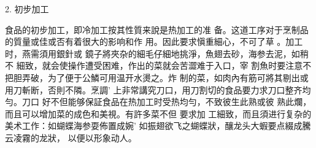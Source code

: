 2.      初步加工

食品的初步加工，即冷加工按其性質来說是热加工的准 备。这道工序对于烹制品的質量或佳或否有着很大的影响和作 用。因此要求愼重細心，不可了草
。加工时，燕需須用銀針或 鏡子將夾杂的細毛仔細地挑淨，魚翅去砂，海参去泥，如稍不 細致，就会使操作遭受困难，作出的菜就会苦澀难于入口，宰 割魚时要注意不把胆弄破，为了便于公鱗可用温开水燙之。炸 制的菜，如肉內有筋可將其剔出或用刀斬断，否則不隣。烹調' 上非常講究刀口，用刀割切的食品要力求刀口整齐均勻。刀口 好不但能够保証食品在热加工时受热均勻，不致彼生此熟或彼 熟此爛，而且可以增加菜的成色和美視。有許多菜不但
要求加 工細致，而且須进行复杂的美术工作：如蝴蝶海参耍佈置成婉' 如振翅欲飞之蝴蝶狀，釀龙头大蝦要点綴成騰云凌霧的龙狀， 以便以形象动人。
